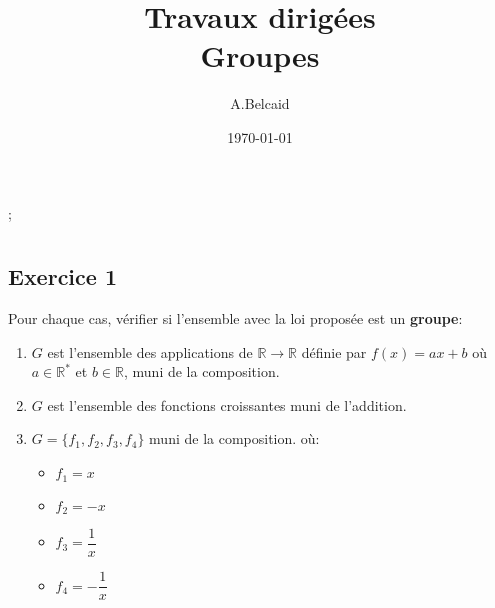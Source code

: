\documentclass{report}
\title{\Huge{Travaux dirigées}\\ Groupes}
\author{\huge{A.Belcaid}}
\date{\today}
\begin{document}
\maketitle
\tableofcontents
\pagebreak
\newcommand{\Rr}{\mathbb{R}};

\chapter{}

\section{Exercice 1}
\qs{}
{
Pour chaque cas, vérifier si l'ensemble avec la loi proposée est un
\textbf{groupe}:

\begin{enumerate}
  \item $G$ est l'ensemble des applications de $\Rr\longrightarrow\Rr$ définie
    par $f(x) = ax + b$ où $a\in \Rr^{*}$ et $b\in \Rr$, muni de la composition.

  \item $G$ est l'ensemble des fonctions croissantes muni de l'addition.
  \item $G = \{f_1, f_2, f_3, f_4\}$ muni de la composition.
    où:\\
    \begin{itemize}
      \item $f_1 = x$\hspace*{8pt}
      \item $f_2 = -x$\hspace*{8pt}
      \item $f_3 = \dfrac{1}{x}$\hspace*{8pt}
      \item $f_4 = -\dfrac{1}{x}$
    \end{itemize}
\end{enumerate}
}
\end{document}
